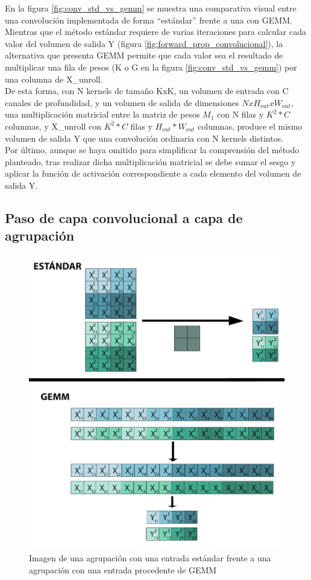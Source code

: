 En la figura \ref{fig:conv_std_vs_gemm} se muestra una comparativa visual entre una convolución implementada de forma ``estándar'' frente a una con GEMM. \\
Mientras que el método estándar requiere de varias iteraciones para calcular cada valor del volumen de salida Y (figura \ref{fig:forward_prop_convolucional}), la alternativa que presenta GEMM permite que cada valor sea el resultado de multiplicar una fila de pesos (K o G en la figura \ref{fig:conv_std_vs_gemm}) por una columna de X\_unroll. \cite{Programming_Massively} \\
De esta forma, con N kernels de tamaño KxK, un volumen de entrada con C canales de profundidad, y un volumen de salida de dimensiones $NxH_{out}xW_{out}$, una multiplicación matricial entre la matriz de pesos $M_1$ con N filas y $K^2*C$ columnas, y X\_unroll con $K^2*C$ filas y $H_{out}*W_{out}$ columnas, produce el mismo volumen de salida Y que una convolución ordinaria con N kernels distintos. \\
Por último, aunque se haya omitido para simplificar la comprensión del método planteado, tras realizar dicha multiplicación matricial se debe sumar el sesgo y aplicar la función de activación correspondiente a cada elemento del volumen de salida Y.

\subsection{Paso de capa convolucional a capa de agrupación}

\begin{figure}[H]
	\centering
	\includegraphics[scale=0.35]{imagenes/maxpool_std_vs_gemm.jpg}  
	\caption{Imagen de una agrupación con una entrada estándar frente a una agrupación con una entrada procedente de GEMM}
	\label{fig:maxpool_std_vs_gemm}
\end{figure}

